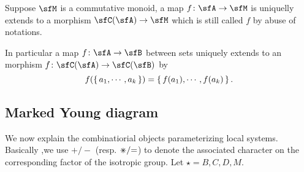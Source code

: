 \documentclass[12pt,a4paper]{amsart}
\numberwithin{equation}{section}
\theoremstyle{remark}
\def\umm{{=}}
\def\upp{{\ast}}
\def\upp{
  {{\setbox0\hbox{$\times$}
      \rlap{\hbox to \wd0{\hss$+$\hss}}\box0
    }}
}
\begin{document}
Suppose $\sfM$ is a commutative monoid, a map $f\colon \sfA\rightarrow \sfM$ is
uniquelly extends to a morphism $\sfC(\sfA)\rightarrow \sfM$ which is still
called $f$ by abuse of notations.

In particular a map $f\colon \sfA\rightarrow \sfB$ between sets uniquely extends to an morphism
$f\colon \sfC(\sfA)\rightarrow \sfC(\sfB)$ by
\[
  f(\set{a_{1},\cdots, a_{k}}) = \set{f(a_{1}), \cdots, f(a_{k})}.
\]

\subsection{Marked Young diagram}
We now explain the combinatiorial objects parameterizing local systems.
Basically ,we use $+/-$ (resp. $\upp/\umm$) to denote the associated character on the
corresponding factor of the isotropic group.
Let $\star=B,C,D,M$.
\end{document}
